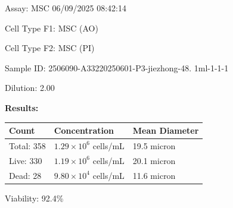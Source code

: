 \documentclass[UTF8,10pt,a4paper,fontset=fandol]{ctexart}
\newcommand{\fieldvalue}[1]{#1}
\begin{document}
\newpage

\noindent Assay:
\fieldvalue{MSC}
\hfill
\fieldvalue{06/09/2025 08:42:14}

\medskip

\noindent Cell Type F1:
\fieldvalue{MSC (AO)}

\noindent Cell Type F2:
\fieldvalue{MSC (PI)}

\medskip

\noindent Sample ID:
\fieldvalue{2506090-A33220250601-P3-jiezhong-48. 1ml-1-1-1}

\noindent Dilution:
\fieldvalue{2.00}

\bigskip
\noindent\textbf{Results:}

\medskip

\begin{tabularx}{\textwidth}{@{}lXX@{}}
\textbf{Count} & \textbf{Concentration} & \textbf{Mean Diameter} \\[2pt]
\hline
Total:
\fieldvalue{358}
&
\fieldvalue{$1.29\times 10^{6}$ cells/mL}
&
\fieldvalue{19.5 micron}
\\
Live:
\fieldvalue{330}
&
\fieldvalue{$1.19\times 10^{6}$ cells/mL}
&
\fieldvalue{20.1 micron}
\\
Dead:
\fieldvalue{28}
&
\fieldvalue{$9.80\times 10^{4}$ cells/mL}
&
\fieldvalue{11.6 micron}
\end{tabularx}

\medskip

Viability:
\fieldvalue{92.4\%}

\bigskip
\end{document}
